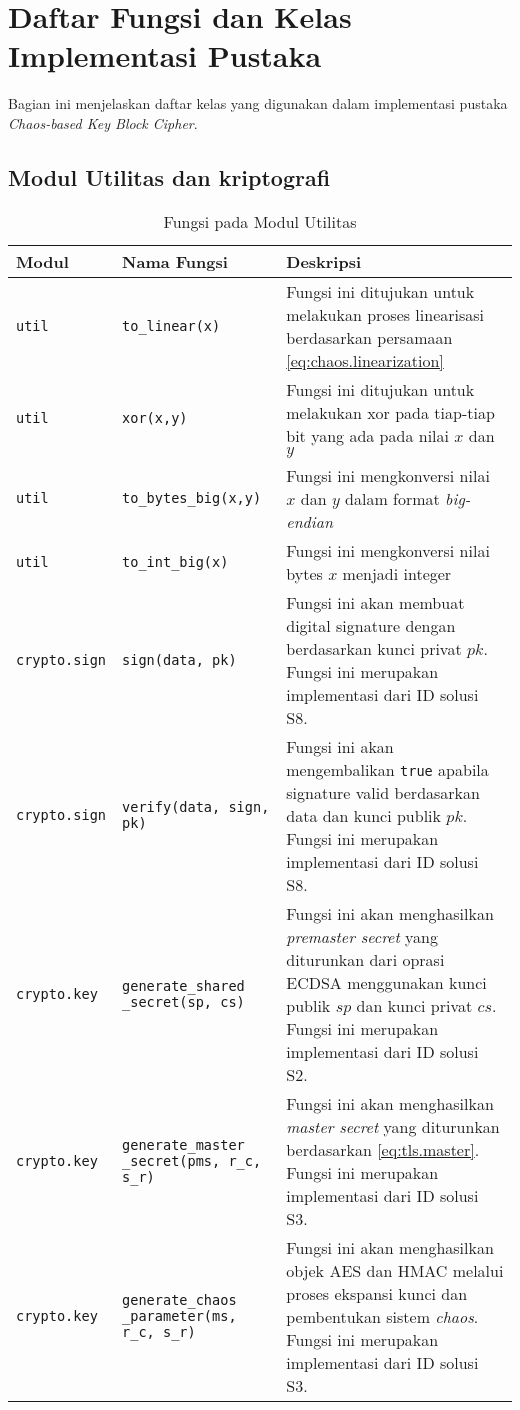 \chapter{{{Daftar Fungsi dan Kelas Implementasi Pustaka}}} 
\label{appendix:impl}

Bagian ini menjelaskan daftar kelas yang digunakan dalam implementasi pustaka \emph{Chaos-based Key Block Cipher}.

\section{Modul Utilitas dan kriptografi}
\label{appendix:impl.util}

\begin{table}[!h]
  \centering
  \caption{Fungsi pada Modul Utilitas} \label{tab:impl.util}
  \begin{tabular}{|p{2.5cm}|p{3.5cm}|p{8cm}|}
    \hline
    \textbf{Modul} & \textbf{Nama Fungsi} & \textbf{Deskripsi} \\ \hline
    \texttt{util} & \texttt{to\_linear(x)} & Fungsi ini ditujukan untuk melakukan proses linearisasi berdasarkan persamaan \ref{eq:chaos.linearization} \\ \hline
    \texttt{util} & \texttt{xor(x,y)} & Fungsi ini ditujukan untuk melakukan xor pada tiap-tiap bit yang ada pada nilai $x$ dan $y$ \\ \hline
    \texttt{util} & \texttt{to\_bytes\_big(x,y)} & Fungsi ini mengkonversi nilai $x$ dan $y$ dalam format \emph{big-endian} \\ \hline
    \texttt{util} & \texttt{to\_int\_big(x)} & Fungsi ini mengkonversi nilai bytes $x$ menjadi integer\\ \hline
    \texttt{crypto.sign} & \texttt{sign(data, pk)} & Fungsi ini akan membuat digital signature dengan berdasarkan kunci privat $pk$. Fungsi ini merupakan implementasi dari ID solusi S8.\\ \hline
    \texttt{crypto.sign} & \texttt{verify(data, sign, pk)} & Fungsi ini akan mengembalikan \texttt{true} apabila signature valid berdasarkan data dan kunci publik $pk$. Fungsi ini merupakan implementasi dari ID solusi S8.\\ \hline
    \texttt{crypto.key} & \texttt{generate\_shared} \texttt{\_secret(sp, cs)} & Fungsi ini akan menghasilkan \emph{premaster secret} yang diturunkan dari oprasi ECDSA menggunakan kunci publik $sp$ dan kunci privat $cs$. Fungsi ini merupakan implementasi dari ID solusi S2.\\ \hline
    \texttt{crypto.key} & \texttt{generate\_master} \texttt{\_secret(pms, r\_c, s\_r)} & Fungsi ini akan menghasilkan \emph{master secret} yang diturunkan berdasarkan \ref{eq:tls.master}. Fungsi ini merupakan implementasi dari ID solusi S3.\\ \hline
    \texttt{crypto.key} & \texttt{generate\_chaos} \texttt{\_parameter(ms, r\_c, s\_r)} & Fungsi ini akan menghasilkan objek AES dan HMAC melalui proses ekspansi kunci dan pembentukan sistem \emph{chaos}. Fungsi ini merupakan implementasi dari ID solusi S3.\\ \hline
  \end{tabular}
\end{table}

